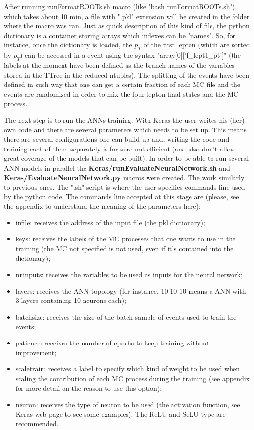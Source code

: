 \documentclass[]{report}
\begin{document}
After running runFormatROOTs.sh macro (like "bash runFormatROOTs.sh"), which takes about 10 min, a file with ".pkl" extension will be created in the folder where the macro was ran. Just as quick description of this kind of file, the python dictionary is a container storing arrays which indexes can be "names". So, for instance, once the dictionary is loaded, the $p_{T}$ of the first lepton (which are sorted by $p_{T}$) can be accessed in a event using the syntax "array[0]['f\_lept1\_pt']" (the labels at the moment have been defined as the branch names of the variables stored in the TTree in the reduced ntuples). The splitting of the events have been defined in such way that one can get a certain fraction of each MC file and the events are randomized in order to mix the four-lepton final states and the MC process. 

The next step is to run the ANNs training. With Keras the user writes his (her) own code and there are several parameters which needs to be set up. This means there are several configurations one can build up and, writing the code and training each of them separately is for sure not efficient (and also don't allow great coverage of the models that can be built). In order to be able to run several ANN models in parallel the \textbf{Keras/runEvaluateNeuralNetwork.sh} and \textbf{Keras/EvaluateNeuralNetwork.py} macros were created. The work similarly to previous ones. The ".sh" script is where the user specifies commands line used by the python code. The commands line accepted at this stage are (please, see the appendix to understand the meaning of the parameters here):
\begin{itemize}
	\item infile: receives the address of the input file (the pkl dictionary);
	\item keys: receives the labels of the MC processes that one wants to use in the training (the MC not specified is not used, even if it's contained into the dictionary);
	\item nninputs: receives the variables to be used as inputs for the neural network;
	\item layers: receives the ANN topology (for instance, 10 10 10 means a ANN with 3 layers containing 10 neurons each);
	\item batchsize: receives the size of the batch sample of events used to train the events;
	\item patience: receives the number of epochs to keep training without improvement;
	\item scaletrain: receives a label to specify which kind of weight to be used when scaling the contribution of each MC process during the training (see appendix for more detail on the reason to use this option);
	\item neuron: receives the type of neuron to be used (the activation function, see Keras web page to see some examples). The ReLU and SeLU type are recommended.
\end{itemize}
\end{document}
